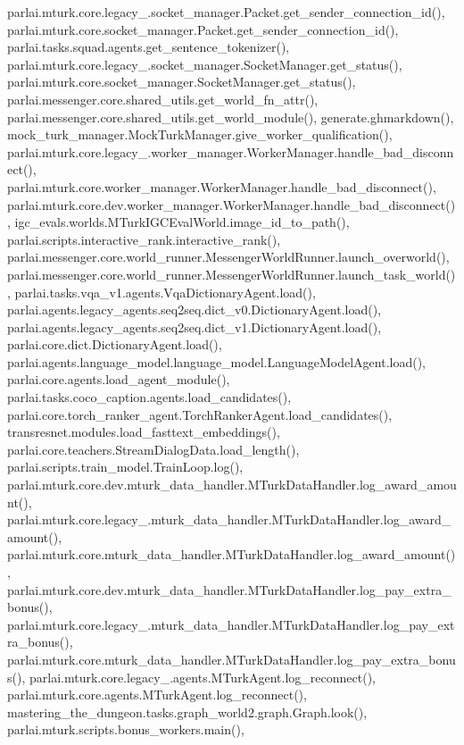 parlai.\+mturk.\+core.\+legacy\+\_.\+socket\+\_\+manager.\+Packet.\+get\+\_\+sender\+\_\+connection\+\_\+id(), parlai.\+mturk.\+core.\+socket\+\_\+manager.\+Packet.\+get\+\_\+sender\+\_\+connection\+\_\+id(), parlai.\+tasks.\+squad.\+agents.\+get\+\_\+sentence\+\_\+tokenizer(), parlai.\+mturk.\+core.\+legacy\+\_.\+socket\+\_\+manager.\+Socket\+Manager.\+get\+\_\+status(), parlai.\+mturk.\+core.\+socket\+\_\+manager.\+Socket\+Manager.\+get\+\_\+status(), parlai.\+messenger.\+core.\+shared\+\_\+utils.\+get\+\_\+world\+\_\+fn\+\_\+attr(), parlai.\+messenger.\+core.\+shared\+\_\+utils.\+get\+\_\+world\+\_\+module(), generate.\+ghmarkdown(), mock\+\_\+turk\+\_\+manager.\+Mock\+Turk\+Manager.\+give\+\_\+worker\+\_\+qualification(), parlai.\+mturk.\+core.\+legacy\+\_.\+worker\+\_\+manager.\+Worker\+Manager.\+handle\+\_\+bad\+\_\+disconnect(), parlai.\+mturk.\+core.\+worker\+\_\+manager.\+Worker\+Manager.\+handle\+\_\+bad\+\_\+disconnect(), parlai.\+mturk.\+core.\+dev.\+worker\+\_\+manager.\+Worker\+Manager.\+handle\+\_\+bad\+\_\+disconnect(), igc\+\_\+evals.\+worlds.\+M\+Turk\+I\+G\+C\+Eval\+World.\+image\+\_\+id\+\_\+to\+\_\+path(), parlai.\+scripts.\+interactive\+\_\+rank.\+interactive\+\_\+rank(), parlai.\+messenger.\+core.\+world\+\_\+runner.\+Messenger\+World\+Runner.\+launch\+\_\+overworld(), parlai.\+messenger.\+core.\+world\+\_\+runner.\+Messenger\+World\+Runner.\+launch\+\_\+task\+\_\+world(), parlai.\+tasks.\+vqa\+\_\+v1.\+agents.\+Vqa\+Dictionary\+Agent.\+load(), parlai.\+agents.\+legacy\+\_\+agents.\+seq2seq.\+dict\+\_\+v0.\+Dictionary\+Agent.\+load(), parlai.\+agents.\+legacy\+\_\+agents.\+seq2seq.\+dict\+\_\+v1.\+Dictionary\+Agent.\+load(), parlai.\+core.\+dict.\+Dictionary\+Agent.\+load(), parlai.\+agents.\+language\+\_\+model.\+language\+\_\+model.\+Language\+Model\+Agent.\+load(), parlai.\+core.\+agents.\+load\+\_\+agent\+\_\+module(), parlai.\+tasks.\+coco\+\_\+caption.\+agents.\+load\+\_\+candidates(), parlai.\+core.\+torch\+\_\+ranker\+\_\+agent.\+Torch\+Ranker\+Agent.\+load\+\_\+candidates(), transresnet.\+modules.\+load\+\_\+fasttext\+\_\+embeddings(), parlai.\+core.\+teachers.\+Stream\+Dialog\+Data.\+load\+\_\+length(), parlai.\+scripts.\+train\+\_\+model.\+Train\+Loop.\+log(), parlai.\+mturk.\+core.\+dev.\+mturk\+\_\+data\+\_\+handler.\+M\+Turk\+Data\+Handler.\+log\+\_\+award\+\_\+amount(), parlai.\+mturk.\+core.\+legacy\+\_.\+mturk\+\_\+data\+\_\+handler.\+M\+Turk\+Data\+Handler.\+log\+\_\+award\+\_\+amount(), parlai.\+mturk.\+core.\+mturk\+\_\+data\+\_\+handler.\+M\+Turk\+Data\+Handler.\+log\+\_\+award\+\_\+amount(), parlai.\+mturk.\+core.\+dev.\+mturk\+\_\+data\+\_\+handler.\+M\+Turk\+Data\+Handler.\+log\+\_\+pay\+\_\+extra\+\_\+bonus(), parlai.\+mturk.\+core.\+legacy\+\_.\+mturk\+\_\+data\+\_\+handler.\+M\+Turk\+Data\+Handler.\+log\+\_\+pay\+\_\+extra\+\_\+bonus(), parlai.\+mturk.\+core.\+mturk\+\_\+data\+\_\+handler.\+M\+Turk\+Data\+Handler.\+log\+\_\+pay\+\_\+extra\+\_\+bonus(), parlai.\+mturk.\+core.\+legacy\+\_.\+agents.\+M\+Turk\+Agent.\+log\+\_\+reconnect(), parlai.\+mturk.\+core.\+agents.\+M\+Turk\+Agent.\+log\+\_\+reconnect(), mastering\+\_\+the\+\_\+dungeon.\+tasks.\+graph\+\_\+world2.\+graph.\+Graph.\+look(), parlai.\+mturk.\+scripts.\+bonus\+\_\+workers.\+main(), 